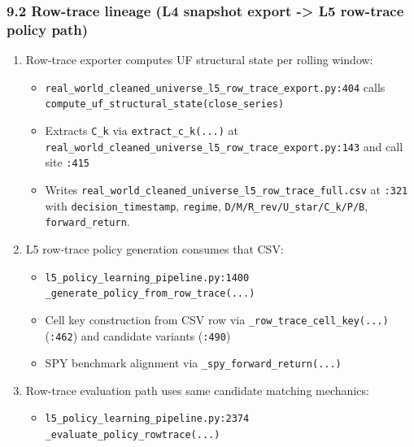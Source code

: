 \documentclass[
]{article}
\providecommand{\tightlist}{%
  \setlength{\itemsep}{0pt}\setlength{\parskip}{0pt}}
\begin{document}
\subsubsection{9.2 Row-trace lineage (L4 snapshot export -\textgreater{}
L5 row-trace policy
path)}\label{92-row-trace-lineage-l4-snapshot-export---l5-row-trace-policy-path}

\begin{enumerate}
\def\labelenumi{\arabic{enumi}.}
\item
  Row-trace exporter computes UF structural state per rolling window:

  \begin{itemize}
  \tightlist
  \item
    \texttt{real\_world\_cleaned\_universe\_l5\_row\_trace\_export.py:404}
    calls \texttt{compute\_uf\_structural\_state(close\_series)}
  \item
    Extracts \texttt{C\_k} via \texttt{extract\_c\_k(...)} at
    \texttt{real\_world\_cleaned\_universe\_l5\_row\_trace\_export.py:143}
    and call site \texttt{:415}
  \item
    Writes
    \texttt{real\_world\_cleaned\_universe\_l5\_row\_trace\_full.csv} at
    \texttt{:321} with \texttt{decision\_timestamp}, \texttt{regime},
    \texttt{D/M/R\_rev/U\_star/C\_k/P/B}, \texttt{forward\_return}.
  \end{itemize}
\item
  L5 row-trace policy generation consumes that CSV:

  \begin{itemize}
  \tightlist
  \item
    \texttt{l5\_policy\_learning\_pipeline.py:1400}
    \texttt{\_generate\_policy\_from\_row\_trace(...)}
  \item
    Cell key construction from CSV row via
    \texttt{\_row\_trace\_cell\_key(...)} (\texttt{:462}) and candidate
    variants (\texttt{:490})
  \item
    SPY benchmark alignment via \texttt{\_spy\_forward\_return(...)}
  \end{itemize}
\item
  Row-trace evaluation path uses same candidate matching mechanics:

  \begin{itemize}
  \tightlist
  \item
    \texttt{l5\_policy\_learning\_pipeline.py:2374}
    \texttt{\_evaluate\_policy\_rowtrace(...)}
  \end{itemize}
\end{enumerate}
\end{document}
